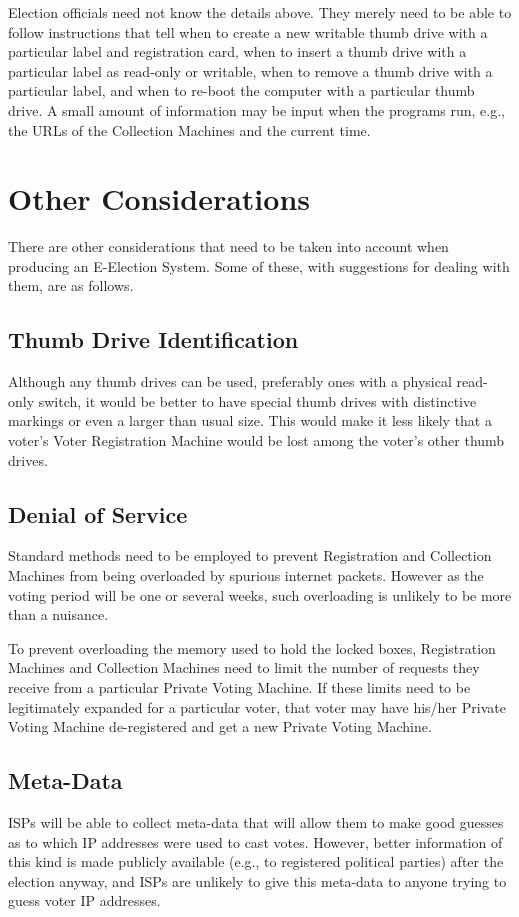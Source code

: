 \documentclass[12pt]{article}
\begin{document}
Election officials need not know the details above.
They merely need to be able to follow instructions that tell
when to create a new writable thumb drive with a particular
label and registration card,
when to insert a thumb drive with a particular label
as read-only or writable,
when to remove a thumb drive with a particular label, and
when to re-boot the computer with a particular thumb drive.
A small amount of information may be input when the programs run,
e.g., the URLs of the Collection Machines and the current time.


\section{Other Considerations}

There are other considerations that need to be taken into
account when producing an E-Election System.  Some of these,
with suggestions for dealing with them, are as follows.

\subsection{Thumb Drive Identification}

Although any thumb drives can be used, preferably ones with
a physical read-only switch, it would be better to
have special thumb drives with distinctive markings or even
a larger than usual size.  This would make it less likely
that a voter's Voter Registration Machine would be lost
among the voter's other thumb drives.

\subsection{Denial of Service}

Standard methods need to be employed to prevent Registration and
Collection Machines from being overloaded by spurious internet packets.
However as the voting period will be one or several weeks, such
overloading is unlikely to be more than a nuisance.

To prevent overloading the memory used to hold the locked boxes,
Registration Machines and Collection Machines need to limit the
number of requests they receive from a particular Private Voting Machine.
If these limits need to be legitimately expanded for a particular
voter, that voter may have his/her Private Voting Machine de-registered
and get a new Private Voting Machine.

\subsection{Meta-Data}

ISPs will be able to collect meta-data that will allow them to
make good guesses as to which IP addresses were used to cast votes.
However, better information of this kind is made publicly available
(e.g., to registered political parties) after the election anyway,
and ISPs are unlikely to give this meta-data to anyone trying to
guess voter IP addresses.
\end{document}
